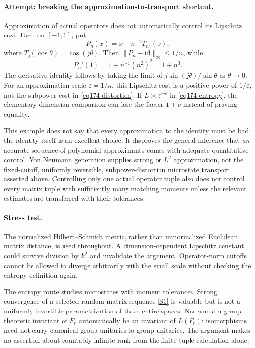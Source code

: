 \documentclass[11pt,a4paper]{article}
\newcommand{\eps}{\varepsilon}
\newcommand{\sref}[2]{\hyperlink{source:#1:#2}{[S#2]}}
\numberwithin{equation}{section}
\begin{document}
\paragraph{Attempt: breaking the approximation-to-transport shortcut.}
Approximation of actual operators does not automatically control its
Lipschitz cost. Even on $[-1,1]$, put
\[
 P_n(x)=x+n^{-1}T_{n^2}(x),
\]
where $T_j(\cos\theta)=\cos(j\theta)$. Then
$\|P_n-\mathrm{id}\|_\infty\le1/n$, while
\[
 P_n'(1)=1+n^{-1}(n^2)^2=1+n^3.
\]
The derivative identity follows by taking the limit of
$j\sin(j\theta)/\sin\theta$ as $\theta\to0$.
For an approximation scale $\eps=1/n$, this Lipschitz cost is a positive
power of $1/\eps$, not the subpower cost in \eqref{eq174-distortion}.
If $L\asymp\eps^{-c}$ in \eqref{eq174-entropy}, the elementary dimension
comparison can lose the factor $1+c$ instead of proving equality.

This example does not say that every approximation to the identity must be
bad: the identity itself is an excellent choice. It disproves the general
inference that \emph{an} accurate sequence of polynomial approximants comes
with adequate quantitative control. Von Neumann generation supplies strong
or $L^2$ approximation, not the fixed-cutoff, uniformly reversible,
subpower-distortion microstate transport asserted above. Controlling only
one actual operator tuple also does not control every matrix tuple with
sufficiently many matching moments unless the relevant estimates are
transferred with their tolerances.

\paragraph{Stress test.}
The normalized Hilbert--Schmidt metric, rather than unnormalized Euclidean
matrix distance, is used throughout. A dimension-dependent Lipschitz
constant could survive division by $k^2$ and invalidate the argument.
Operator-norm cutoffs cannot be allowed to diverge arbitrarily with the
small scale without checking the entropy definition again.

The entropy route studies microstates with moment tolerances. Strong
convergence of a selected random-matrix sequence \sref{statement}{1} is valuable
but is not a uniformly invertible parametrization of those entire spaces.
Nor would a group-theoretic invariant of $F_r$ automatically be an invariant
of $L(F_r)$: isomorphisms need not carry canonical group unitaries to group
unitaries. The argument makes no assertion about countably infinite rank
from the finite-tuple calculation alone.
\end{document}
